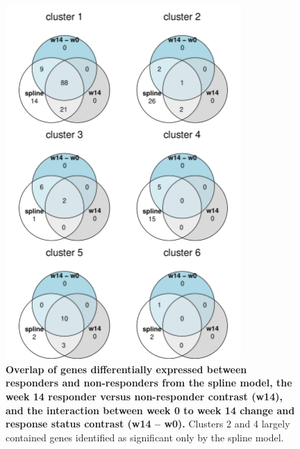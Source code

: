 \begin{figure}
    \centering
    \includegraphics[width=0.8\textwidth,page=1]{mainmatter/figures/chapter_04/plot_gene_set_enrichment.spline_cluster_venns.pdf}
    \caption[
    ]{
        \textbf{
            Overlap of genes differentially expressed between responders and non-responders from the spline model,
            the week 14 responder versus non-responder contrast (w14), 
            and the interaction between week 0 to week 14 change and response status contrast (w14 -- w0).
        }
        Clusters 2 and 4 largely contained genes identified as significant only by the spline model.
    }
    \label{fig:plot_gene_set_enrichment.spline_cluster_venns.pdf}
\end{figure}

